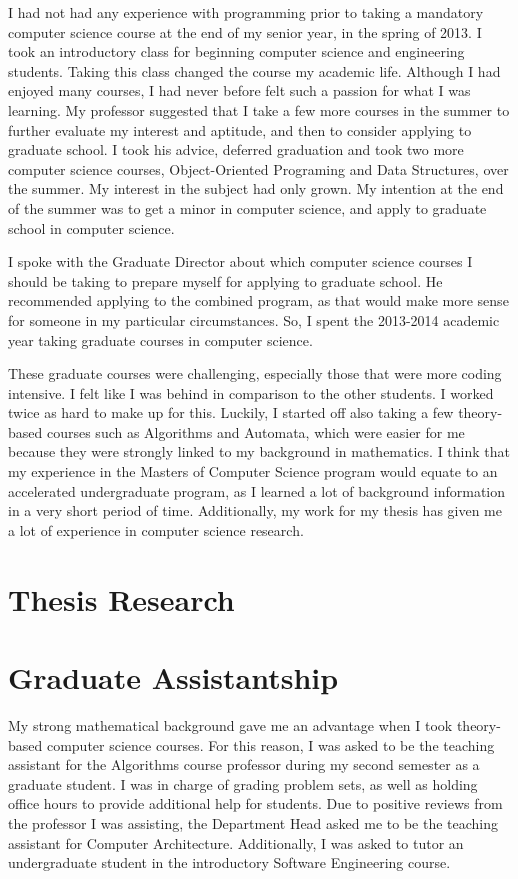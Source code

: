\documentclass[12pt]{article}
\begin{document}
I had not had any experience with programming prior to taking a mandatory computer science course at the end of my senior year, in the spring of 2013. I took an introductory class for beginning computer science and engineering students. Taking this class changed the course my academic life. Although I had enjoyed many courses, I had never before felt such a passion for what I was learning. My professor suggested that I take a few more courses in the summer to further evaluate my interest and aptitude, and then to consider applying to graduate school. I took his advice, deferred graduation and took two more computer science courses, Object-Oriented Programing and Data Structures, over the summer.  My interest in the subject had only grown. My intention at the end of the summer was to get a minor in computer science, and apply to graduate school in computer science. 

I spoke with the Graduate Director about  which computer science courses I should be taking to prepare myself for applying to graduate school. He recommended applying to the combined program, as that would make more sense for someone in my particular circumstances. So, I spent the 2013-2014 academic year taking graduate courses in computer science. 


These graduate courses were challenging, especially those that were more coding intensive. I felt like I was behind in comparison to the other students. I worked twice as hard to make up for this. Luckily, I started off also taking a few theory-based courses such as Algorithms and Automata, which were easier for me because they were strongly linked to my background in mathematics. I think that my experience in the Masters of Computer Science program would equate to an accelerated undergraduate program, as I learned a lot of background information in a very short period of time. Additionally, my work for my thesis has given me a lot of experience in computer science research.

\section*{Thesis Research}


\section*{Graduate Assistantship}
My strong mathematical background gave me an advantage when I took theory-based computer science courses. For this reason, I was asked to be the teaching assistant for the Algorithms course professor during my second semester as a graduate student. I was in charge of grading problem sets, as well as holding office hours to provide additional help for students. Due to positive reviews from the professor I was assisting, the Department Head asked me to be the teaching assistant for Computer Architecture. Additionally, I was asked to tutor an undergraduate student in the introductory Software Engineering course.
\end{document}
